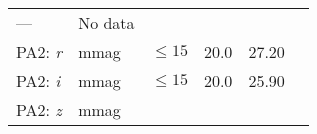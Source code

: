 \documentclass[DM,lsstdraft,toc]{lsstdoc}
\begin{document}
\begin{longtable}[]{@{}llllll@{}}
\begin{minipage}[t]{0.12\columnwidth}
---\strut
\end{minipage} & \begin{minipage}[t]{0.17\columnwidth}\raggedright\strut
No data\strut
\end{minipage}\tabularnewline
\begin{minipage}[t]{0.14\columnwidth}\raggedright\strut
PA2: \emph{r}\strut
\end{minipage} & \begin{minipage}[t]{0.06\columnwidth}\raggedright\strut
mmag\strut
\end{minipage} & \begin{minipage}[t]{0.17\columnwidth}\raggedright\strut
\(\leq 15\)\strut
\end{minipage} & \begin{minipage}[t]{0.17\columnwidth}\raggedright\strut
20.0\strut
\end{minipage} & \begin{minipage}[t]{0.12\columnwidth}\raggedright\strut
27.20\strut
\end{minipage} & \begin{minipage}[t]{0.17\columnwidth}\raggedright\strut
\strut
\end{minipage}\tabularnewline
\begin{minipage}[t]{0.14\columnwidth}\raggedright\strut
PA2: \emph{i}\strut
\end{minipage} & \begin{minipage}[t]{0.06\columnwidth}\raggedright\strut
mmag\strut
\end{minipage} & \begin{minipage}[t]{0.17\columnwidth}\raggedright\strut
\(\leq 15\)\strut
\end{minipage} & \begin{minipage}[t]{0.17\columnwidth}\raggedright\strut
20.0\strut
\end{minipage} & \begin{minipage}[t]{0.12\columnwidth}\raggedright\strut
25.90\strut
\end{minipage} & \begin{minipage}[t]{0.17\columnwidth}\raggedright\strut
\strut
\end{minipage}\tabularnewline
\begin{minipage}[t]{0.14\columnwidth}\raggedright\strut
PA2: \emph{z}\strut
\end{minipage} & \begin{minipage}[t]{0.06\columnwidth}\raggedright\strut
mmag\strut
\end{minipage} & \begin{minipage}[t]{0.17\columnwidth}\raggedright\strut

\end{minipage}
\end{longtable}
\end{document}
